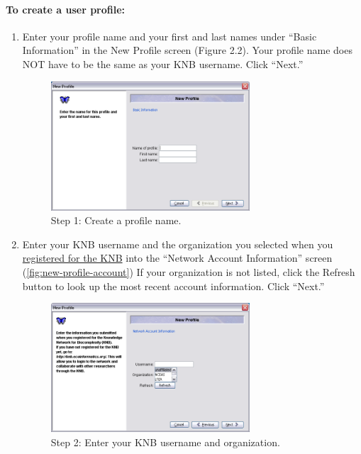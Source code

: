 \paragraph{To create a user profile:}
\begin{enumerate}
  \item Enter your profile name and your first and last names under
    ``Basic Information'' in the New Profile screen (Figure 2.2). Your
    profile name does NOT have to be the same as your KNB username.
    Click ``Next.''

  \begin{figure}
    \centering
      \includegraphics[width=0.7\textwidth]{images/new-profile-name.png}
    \caption{Step 1: Create a profile name.}
    \label{fig:new-profile-name}
  \end{figure}

  \item Enter your KNB username and the organization you selected when
    you \hyperref[sec:register]{registered for the KNB} into the
    ``Network Account Information'' screen
    (\autoref{fig:new-profile-account}) If your organization is not
    listed, click the Refresh button to look up the most recent account
    information. Click ``Next.'' 

  \begin{figure}
    \centering
      \includegraphics[width=0.7\textwidth]{images/new-profile-account.png}
    \caption{Step 2: Enter your KNB username and organization.}
    \label{fig:new-profile-account}
  \end{figure}


\end{enumerate}
